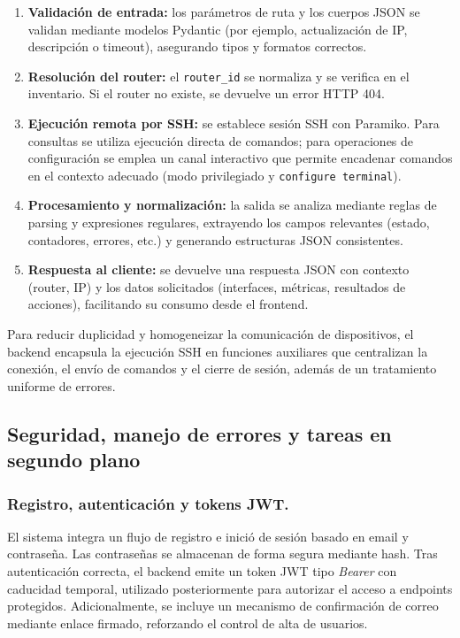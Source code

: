 \begin{enumerate}
    \item \textbf{Validación de entrada:} los parámetros de ruta y los cuerpos JSON se validan mediante modelos Pydantic (por ejemplo, actualización de IP, descripción o timeout), asegurando tipos y formatos correctos.
    \item \textbf{Resolución del router:} el \texttt{router\_id} se normaliza y se verifica en el inventario. Si el router no existe, se devuelve un error HTTP 404.
    \item \textbf{Ejecución remota por SSH:} se establece sesión SSH con Paramiko. Para consultas se utiliza ejecución directa de comandos; para operaciones de configuración se emplea un canal interactivo que permite encadenar comandos en el contexto adecuado (modo privilegiado y \texttt{configure terminal}).
    \item \textbf{Procesamiento y normalización:} la salida se analiza mediante reglas de parsing y expresiones regulares, extrayendo los campos relevantes (estado, contadores, errores, etc.) y generando estructuras JSON consistentes.
    \item \textbf{Respuesta al cliente:} se devuelve una respuesta JSON con contexto (router, IP) y los datos solicitados (interfaces, métricas, resultados de acciones), facilitando su consumo desde el frontend.
\end{enumerate}

Para reducir duplicidad y homogeneizar la comunicación de dispositivos, el backend encapsula la ejecución SSH en funciones auxiliares que centralizan la conexión, el envío de comandos y el cierre de sesión, además de un tratamiento uniforme de errores.

\subsection{Seguridad, manejo de errores y tareas en segundo plano}

\subsubsection*{Registro, autenticación y tokens JWT.}
\vspace*{0.5cm}

El sistema integra un flujo de registro e inició de sesión basado en email y contraseña. Las contraseñas se almacenan de forma segura mediante hash. Tras autenticación correcta, el backend emite un token JWT tipo \textit{Bearer} con caducidad temporal, utilizado posteriormente para autorizar el acceso a endpoints protegidos. Adicionalmente, se incluye un mecanismo de confirmación de correo mediante enlace firmado, reforzando el control de alta de usuarios.

